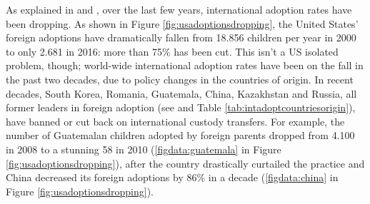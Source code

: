 As explained in \cite{adoptdropping_article} and \cite{adoptdropping_book}, over the last few years, international adoption rates have been dropping. As shown in Figure \ref{fig:usadoptionsdropping}, the United States' foreign adoptions have dramatically fallen from 18.856 children per year in 2000 to only 2.681 in 2016: more than 75\% has been cut. This isn't a US isolated problem, though; world-wide international adoption rates have been on the fall in the past two decades, due to policy changes in the countries of origin. In recent decades, South Korea, Romania, Guatemala, China, Kazakhstan and Russia, all former leaders in foreign adoption (see \cite{unreport} and Table \ref{tab:intadoptcountriesorigin}), have banned or cut back on international custody transfers. For example, the number of Guatemalan children adopted by foreign parents dropped from 4.100 in 2008 to a stunning 58 in 2010 (\ref{figdata:guatemala} in Figure \ref{fig:usadoptionsdropping}), after the country drastically curtailed the practice and China decreased its foreign adoptions by 86\% in a decade (\ref{figdata:china} in Figure \ref{fig:usadoptionsdropping}).

